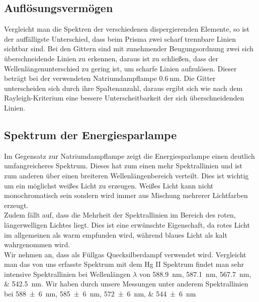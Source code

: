\subsection{Auflösungsvermögen}
Vergleicht man die Spektren der verschiedenen dispergierenden Elemente, so ist der auffälligste Unterschied, dass beim Prisma zwei scharf trennbare Linien sichtbar sind. Bei den Gittern sind mit zunehmender Beugungsordnung zwei sich überschneidende Linien zu erkennen, daraus ist zu schließen, dass der Wellenlängenunterschied zu gering ist, um scharfe Linien aufzulösen.
Dieser beträgt bei der verwendeten Natriumdampflampe $ \SI{0,6}{\nano\meter} $. Die Gitter unterscheiden sich durch ihre Spaltenanzahl, daraus ergibt sich wie nach dem Rayleigh-Kriterium eine bessere Unterscheitbarkeit der sich überschneidenden Linien. 


\subsection{Spektrum der Energiesparlampe}
Im Gegensatz zur Natriumdampflampe zeigt die Energiesparlampe einen deutlich umfangreicheres Spektrum. Dieses hat zum einen mehr Spektrallinien und ist zum anderen über einen breiteren Wellenlängenbereich verteilt. Dies ist wichtig um ein möglichst weißes Licht zu erzeugen. Weißes Licht kann nicht monochromatisch sein sondern wird immer aus Mischung mehrerer Lichtfarben erzeugt.\\
Zudem fällt auf, dass die Mehrheit der Spektrallinien im Bereich des roten, längerwelligen Lichtes liegt. Dies ist eine erwünschte Eigenschaft, da rotes Licht im allgemeinen als warm empfunden wird, während blaues Licht als kalt wahrgenommen wird. \\
Wir nehmen an, dass als Füllgas Quecksilberdampf verwendet wird. Vergleicht man das von uns erfasste Spektrum mit dem Hg II Spektrum \cite{NIST_ASD} findet man sehr intensive Spektrallinien bei Wellenlängen $ \lambda $ von \SIlist{588,9; 587.1;567.7;542.5}{\nano\meter}. Wir haben durch unsere Messungen unter anderem Spektrallinien bei \SIlist{588(6);585(6);572(6);544(6)}{\nano\meter}

